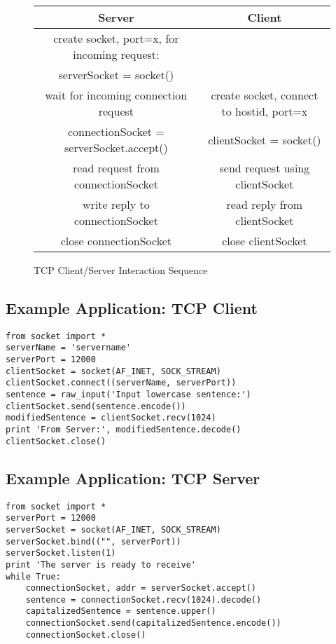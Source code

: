 \documentclass[12pt]{article}
\begin{document}
\begin{figure}[h]
    \centering
    \begin{tabular}{|c|c|}
        \hline
        \textbf{Server}                              & \textbf{Client}                          \\
        \hline
        create socket, port=x, for incoming request: &                                          \\
        serverSocket = socket()                      &                                          \\
        \hline
        wait for incoming connection request         & create socket, connect to hostid, port=x \\
        connectionSocket = serverSocket.accept()     & clientSocket = socket()                  \\
        \hline
        read request from connectionSocket           & send request using clientSocket          \\
        \hline
        write reply to connectionSocket              & read reply from clientSocket             \\
        \hline
        close connectionSocket                       & close clientSocket                       \\
        \hline
    \end{tabular}
    \caption{TCP Client/Server Interaction Sequence}
\end{figure}

\subsection{Example Application: TCP Client}

\begin{verbatim}
from socket import *
serverName = 'servername'
serverPort = 12000
clientSocket = socket(AF_INET, SOCK_STREAM)
clientSocket.connect((serverName, serverPort))
sentence = raw_input('Input lowercase sentence:')
clientSocket.send(sentence.encode())
modifiedSentence = clientSocket.recv(1024)
print 'From Server:', modifiedSentence.decode()
clientSocket.close()
\end{verbatim}

\subsection{Example Application: TCP Server}

\begin{verbatim}
from socket import *
serverPort = 12000
serverSocket = socket(AF_INET, SOCK_STREAM)
serverSocket.bind(("", serverPort))
serverSocket.listen(1)
print 'The server is ready to receive'
while True:
    connectionSocket, addr = serverSocket.accept()
    sentence = connectionSocket.recv(1024).decode()
    capitalizedSentence = sentence.upper()
    connectionSocket.send(capitalizedSentence.encode())
    connectionSocket.close()
\end{verbatim}
\end{document}
